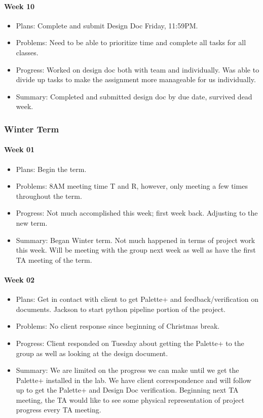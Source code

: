 \paragraph{Week 10}
\begin{itemize}
\item Plans: Complete and submit Design Doc Friday, 11:59PM.
\item Problems: Need to be able to prioritize time and complete all tasks for all classes.
\item Progress: Worked on design doc both with team and individually. 
Was able to divide up tasks to make the assignment more manageable for us individually.
\item Summary: Completed and submitted design doc by due date, survived dead week.
\end{itemize}
\subsubsection{Winter Term}
\paragraph{Week 01}
\begin{itemize}
\item Plans: Begin the term.
\item Problems: 8AM meeting time T and R, however, only meeting a few times throughout the term.
\item Progress: Not much accomplished this week; first week back. Adjusting to the new term.
\item Summary: Began Winter term. 
Not much happened in terms of project work this week. 
Will be meeting with the group next week as well as have the first TA meeting of the term.
\end{itemize}
\paragraph{Week 02}
\begin{itemize}
\item Plans: Get in contact with client to get Palette+ and feedback/verification on documents. 
Jackson to start python pipeline portion of the project.
\item Problems: No client response since beginning of Christmas break.
\item Progress: Client responded on Tuesday about getting the Palette+ to the group as well as looking at the design document.
\item Summary: We are limited on the progress we can make until we get the Palette+ installed in the lab. 
We have client correspondence and will follow up to get the Palette+ and Design Doc verification. 
Beginning next TA meeting, the TA would like to see some physical representation of project progress every TA meeting.
\end{itemize}
